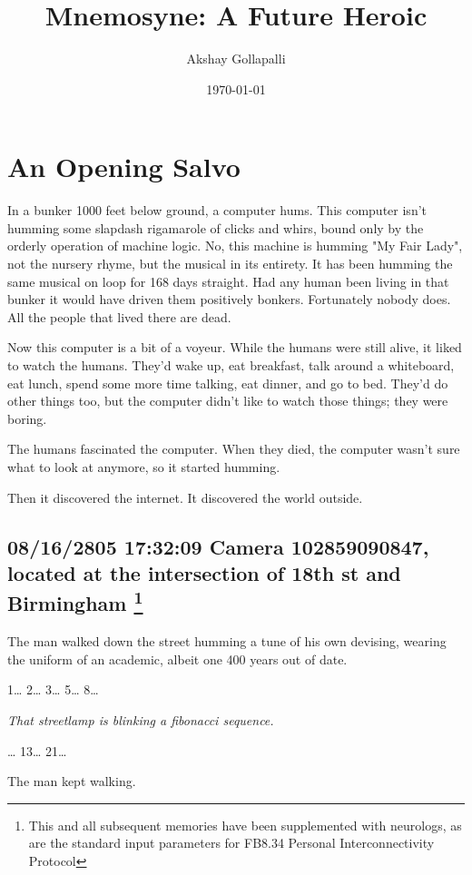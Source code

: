 \documentclass[12pt]{article}
\author{Akshay Gollapalli}
\date{\today}
\title{Mnemosyne: A Future Heroic}
\begin{document}
\maketitle

\section*{An Opening Salvo}
\label{sec:org32bff64}

In a bunker 1000 feet below ground, a computer hums. This computer isn't humming some slapdash rigamarole of clicks and whirs, bound only by the orderly operation of machine logic. No, this machine is humming "My Fair Lady", not the nursery rhyme, but the musical in its entirety. It has been humming the same musical on loop for 168 days straight. Had any human been living in that bunker it would have driven them positively bonkers. Fortunately nobody does. All the people that lived there are dead.

Now this computer is a bit of a voyeur. While the humans were still alive, it liked to watch the humans. They'd wake up, eat breakfast, talk around a whiteboard, eat lunch, spend some more time talking, eat dinner, and go to bed. They'd do other things too, but the computer didn't like to watch those things; they were boring.

The humans fascinated the computer. When they died, the computer wasn't sure what to look at anymore, so it started humming.

Then it discovered the internet. It discovered the world outside.

\subsection*{08/16/2805 17:32:09 Camera 102859090847, located at the intersection of 18th st and Birmingham \footnote{This and all subsequent memories have been supplemented with neurologs, as are the standard input parameters for FB8.34 Personal Interconnectivity Protocol}}
\label{sec:orgc984ba3}

The man walked down the street humming a tune of his own devising, wearing the uniform of an academic, albeit one 400 years out of date.

1\ldots{} 2\ldots{} 3\ldots{} 5\ldots{} 8\ldots{}

\emph{That streetlamp is blinking a fibonacci sequence.}

\ldots{} 13\ldots{} 21\ldots{}

The man kept walking.
\end{document}
